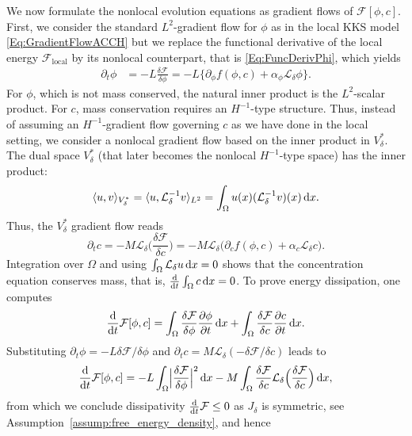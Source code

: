 \documentclass[]{article}
\newcommand{\ddt}{\frac{\textup{d}}{\textup{d}t}}
\newcommand{\dx}{\,\textup{d}x}
\begin{document}
We now formulate the nonlocal evolution equations as gradient flows of \(\mathcal{F}[\phi,c]\).  First, we consider the standard $L^2$-gradient flow for $\phi$ as in the local KKS model \eqref{Eq:GradientFlowACCH} but we replace the functional derivative of the local energy $\mathcal{F}_\text{local}$ by its nonlocal counterpart, that is \eqref{Eq:FuncDerivPhi}, which yields
\begin{equation}
	\label{Eq:NonlocalKKS}
	\begin{aligned}
		\partial_t \phi
		&= -L\frac{\delta \mathcal{F}}{\delta \phi}
		= -L\bigl\{\partial_\phi f(\phi,c)
		+ \alpha_{\phi}\mathcal{L}_\delta \phi \bigr\}. 
	\end{aligned}
\end{equation}
For \(\phi\), which is not mass conserved, the natural inner product is the \(L^2\)-scalar product.  For \(c\), mass conservation requires an \(H^{-1}\)-type structure. Thus, instead of assuming an $H^{-1}$-gradient flow governing $c$ as we have done in the local setting, we consider a nonlocal gradient flow based on the inner product in $V_\delta^*$. The dual space $V_\delta^*$ (that later becomes the nonlocal $H^{-1}$-type space) has the inner product:
\begin{equation}
	\langle u, v \rangle_{V_\delta^*}
	= \langle u, \mathcal{L}_\delta^{-1} v \rangle_{L^2}
	= \int_{\Omega} u(x) (\mathcal{L}_\delta^{-1} v)(x)  \dx.
	\label{eq:V_nl_dual_inner}
\end{equation}
Thus, the $V_\delta^*$ gradient flow reads 
$$
\partial_t c = -M \mathcal{L}_\delta \Big(\frac{\delta\mathcal{F}}{\delta c}\Big)=-M \mathcal{L}_\delta \big(\partial_c f(\phi,c)+\alpha_c \mathcal{L}_\delta c\big).
$$
Integration over \(\Omega\) and using $\int_\Omega \mathcal{L}_\delta u  \dx =0$ shows that the concentration equation conserves mass, that is, $\ddt \int_{\Omega} c\dx = 0$.
To prove energy dissipation, one computes
\[
\ddt\mathcal{F}[\phi,c]
= \int_{\Omega} \frac{\delta \mathcal{F}}{\delta \phi}\frac{\partial \phi}{\partial t}\dx
+ \int_{\Omega} \frac{\delta \mathcal{F}}{\delta c}\frac{\partial c}{\partial t}\dx.
\]
Substituting \(\partial_t \phi = -L\delta\mathcal{F}/\delta\phi\) and \(\partial_t c = M\mathcal{L}_\delta(-\delta\mathcal{F}/\delta c)\) leads to
\[
\ddt\mathcal{F}[\phi,c]
= -L \int_{\Omega} \Bigl|\frac{\delta \mathcal{F}}{\delta \phi}\Bigr|^2\dx
- M \int_{\Omega} \frac{\delta \mathcal{F}}{\delta c}\mathcal{L}_\delta\Bigl(\frac{\delta \mathcal{F}}{\delta c}\Bigr)\dx,
\]
from which we conclude dissipativity \(\ddt\mathcal{F}\le 0\) as \(J_\delta\) is symmetric, see Assumption~\ref{assump:free_energy_density}, and hence
\end{document}
